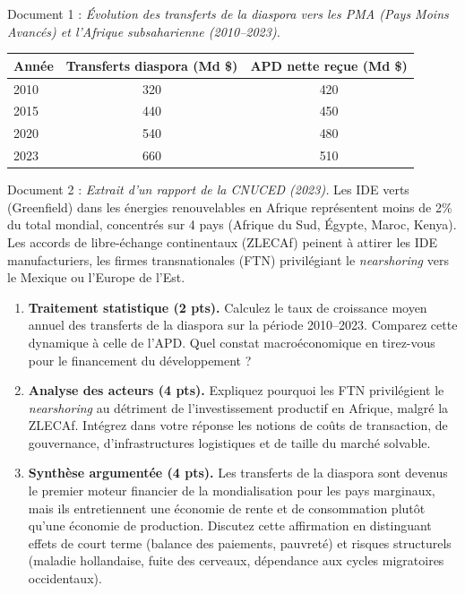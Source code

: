 \documentclass[11pt]{article}
\begin{document}
\begin{exercice}
\noindent Document 1 : \textit{Évolution des transferts de la diaspora vers les PMA (Pays Moins Avancés) et l'Afrique subsaharienne (2010--2023).}
\begin{center}
\begin{tabular}{lcc}
\toprule
\textbf{Année} & \textbf{Transferts diaspora (Md \$)} & \textbf{APD nette reçue (Md \$)} \\
\midrule
2010 & 320 & 420 \\
2015 & 440 & 450 \\
2020 & 540 & 480 \\
2023 & 660 & 510 \\
\bottomrule
\end{tabular}
\end{center}

\noindent Document 2 : \textit{Extrait d'un rapport de la CNUCED (2023).} \og Les IDE verts (Greenfield) dans les énergies renouvelables en Afrique représentent moins de 2\% du total mondial, concentrés sur 4 pays (Afrique du Sud, Égypte, Maroc, Kenya). Les accords de libre-échange continentaux (ZLECAf) peinent à attirer les IDE manufacturiers, les firmes transnationales (FTN) privilégiant le \textit{nearshoring} vers le Mexique ou l'Europe de l'Est. \fg

\begin{enumerate}
\item \textbf{Traitement statistique (2 pts).} Calculez le taux de croissance moyen annuel des transferts de la diaspora sur la période 2010--2023. Comparez cette dynamique à celle de l'APD. Quel constat macroéconomique en tirez-vous pour le financement du développement ?
\item \textbf{Analyse des acteurs (4 pts).} Expliquez pourquoi les FTN privilégient le \textit{nearshoring} au détriment de l'investissement productif en Afrique, malgré la ZLECAf. Intégrez dans votre réponse les notions de coûts de transaction, de gouvernance, d'infrastructures logistiques et de taille du marché solvable.
\item \textbf{Synthèse argumentée (4 pts).} \og Les transferts de la diaspora sont devenus le premier moteur financier de la mondialisation pour les pays marginaux, mais ils entretiennent une économie de rente et de consommation plutôt qu'une économie de production. \fg Discutez cette affirmation en distinguant effets de court terme (balance des paiements, pauvreté) et risques structurels (maladie hollandaise, fuite des cerveaux, dépendance aux cycles migratoires occidentaux).
\end{enumerate}
\end{exercice}
\end{document}
